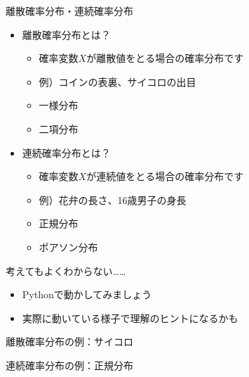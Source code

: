 \documentclass[dvipdfmx,cjk]{beamer}
\begin{document}
\begin{frame}{離散確率分布・連続確率分布}

\begin{itemize}

    \item 離散確率分布とは？
        \begin{itemize}
        \item 確率変数$X$が離散値をとる場合の確率分布です
        \item 例）コインの表裏、サイコロの出目
        \item 一様分布
        \item 二項分布
        \end{itemize}

    \item 連続確率分布とは？
        \begin{itemize}
        \item 確率変数$X$が連続値をとる場合の確率分布です
        \item 例）花弁の長さ、16歳男子の身長
        \item 正規分布
        \item ポアソン分布
        \end{itemize}

\end{itemize}

\end{frame}


\begin{frame}{考えてもよくわからない……}

\begin{itemize}
    \item Pythonで動かしてみましょう
    \item 実際に動いている様子で理解のヒントになるかも
\end{itemize}

\end{frame}


\begin{frame}{離散確率分布の例：サイコロ}


\end{frame}


\begin{frame}{連続確率分布の例：正規分布}


\end{frame}
\end{document}
